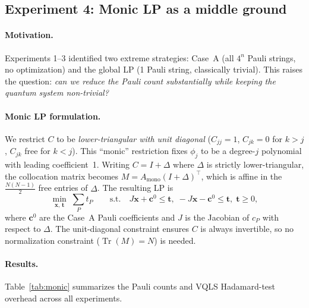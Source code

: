 \documentclass[a4paper,12pt]{amsart}
\begin{document}
\subsection{Experiment 4: Monic LP as a middle ground}

\paragraph{Motivation.}
Experiments 1--3 identified two extreme strategies: Case~A (all $4^n$ Pauli strings, no optimization) and the global LP (1 Pauli string, classically trivial). This raises the question: \emph{can we reduce the Pauli count substantially while keeping the quantum system non-trivial?}

\paragraph{Monic LP formulation.}
We restrict $C$ to be \emph{lower-triangular with unit diagonal} ($C_{jj}=1$, $C_{jk}=0$ for $k>j$, $C_{jk}$ free for $k<j$). This ``monic'' restriction fixes $\phi_j$ to be a degree-$j$ polynomial with leading coefficient~1. Writing $C = I + \Delta$ where $\Delta$ is strictly lower-triangular, the collocation matrix becomes $M = A_{\mathrm{mono}}(I+\Delta)^\top$, which is affine in the $\tfrac{N(N-1)}{2}$ free entries of $\Delta$. The resulting LP is
\begin{equation}
    \min_{\mathbf{x},\,\mathbf{t}}\;\sum_{P} t_P
    \qquad\text{s.t.}\quad J\mathbf{x} + \mathbf{c}^0 \leq \mathbf{t},\;
    -J\mathbf{x} - \mathbf{c}^0 \leq \mathbf{t},\;
    \mathbf{t} \geq 0,
\end{equation}
where $\mathbf{c}^0$ are the Case~A Pauli coefficients and $J$ is the Jacobian of $c_P$ with respect to $\Delta$. The unit-diagonal constraint ensures $C$ is always invertible, so no normalization constraint ($\operatorname{Tr}(M)=N$) is needed.

\paragraph{Results.}
Table~\ref{tab:monic} summarizes the Pauli counts and VQLS Hadamard-test overhead across all experiments.
\end{document}
